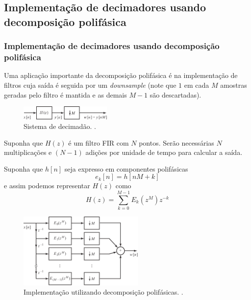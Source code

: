 \subsection{Implementação de decimadores usando decomposição polifásica}
\begin{frame}[allowframebreaks]
  \frametitle{Implementação de decimadores usando decomposição polifásica}

  Uma aplicação importante da decomposição polifásica é na implementação de filtros
  cuja saída é seguida por um \textit{downsample} (note que $1$ em cada $M$ amostras
  geradas pelo filtro é mantida e as demais $M-1$ são descartadas).

        \begin{figure}[h!]
        \centering
        \includegraphics[width=0.4\textwidth]{images/fig438.pdf}
        \caption{Sistema de decimadão. \citep{oppenheim2009}.}
        \label{fig:fig438}
        \end{figure}

  Suponha que $H(z)$ é um filtro FIR com $N$ pontos. Serão necessárias $N$ multiplicações 
  e $(N-1)$ adições por unidade de tempo para calcular a saída.

  Suponha que $h[n]$ seja expresso em componentes polifásicas
  \begin{equation}
   e_k[n] = h[nM+k]
  \end{equation}
  e assim podemos representar $H(z)$ como
  \begin{equation}
   H(z) = \sum_{k=0}^{M-1} E_k (z^M) z^{-k} 
  \end{equation} 

        \begin{figure}[h!]
        \centering
        \includegraphics[width=0.55\textwidth]{images/fig439.pdf}
        \caption{Implementação utilizando decomposição polifásicas. \citep{oppenheim2009}.}
        \label{fig:fig439}
        \end{figure}


\end{frame}
